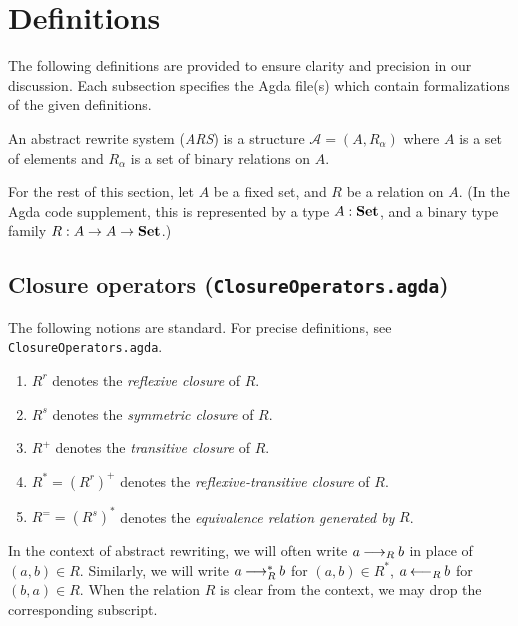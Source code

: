 \section{Definitions}
\label{sec:Definitions}
The following definitions are provided to ensure clarity and precision
in our discussion. Each subsection specifies the Agda file(s) which contain formalizations of the given definitions.

\begin{definition}
    An abstract rewrite system (\emph{ARS}) is a structure $\mathcal{A} = (A, R_\alpha)$ where
     $A$ is a set of elements and $R_\alpha$ is a set of binary relations on $A$.
\end{definition}

For the rest of this section, let $A$ be a fixed set, and $R$ be a relation on $A$.
(In the Agda code supplement, this is represented by a type $A : \mathbf{Set}$,
and a binary type family $R : A \to A \to \mathbf{Set}$.)


\subsection{Closure operators (\texttt{ClosureOperators.agda})}
\begin{notation}
  The following notions are standard.  For precise definitions,
  see \texttt{ClosureOperators.agda}.
  \begin{enumerate}
    \item $R^r$ denotes the \emph{reflexive closure} of $R$.
    \item $R^s$ denotes the \emph{symmetric closure} of $R$.
    \item $R^+$ denotes the \emph{transitive closure} of $R$.
    \item $R^* = (R^r)^+$ denotes the \emph{reflexive-transitive closure} of $R$.
    \item $R^= = (R^s)^*$ denotes the \emph{equivalence relation generated by} $R$.
  \end{enumerate}
\end{notation}




In the context of abstract rewriting, we will often write $a \mathbin{\longrightarrow_R} b$
in place of $(a,b) \in R$.  Similarly, we will write $a \mathbin{\longrightarrow_R^*} b$ for $(a,b) \in R^*$,
$a \mathbin{\longleftarrow_R} b$ for $(b,a) \in R$.  When the relation $R$ is clear from the context,
we may drop the corresponding subscript.

